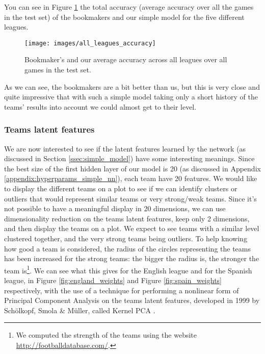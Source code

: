 \documentclass[10pt,conference,onecolumn]{IEEEtran}
\begin{document}
You can see in Figure \ref{fig:all_leagues_accuracy} the total accuracy (average accuracy over all the games in the test set) of the bookmakers and our simple model for the five different leagues.

\begin{figure}[H]
\centering
\texttt{[image: images/all\_leagues\_accuracy]}
\caption{Bookmaker's and our average accuracy across all leagues over all games in the test set.}
\label{fig:all_leagues_accuracy}
\end{figure}

As we can see, the bookmakers are a bit better than us, but this is very close and quite impressive that with such a simple model taking only a short history of the teams' results into account we could almost get to their level.
\newline

\subsubsection{Teams latent features}\label{ssec:teams_features}
We are now interested to see if the latent features learned by the network (as discussed in Section \ref{ssec:simple_model}) have some interesting meanings. Since the best size of the first hidden layer of our model is 20 (as discussed in Appendix \ref{appendix:hyperparams_simple_nn}), each team have 20 features. We would like to display the different teams on a plot to see if we can identify clusters or outliers that would represent similar teams or very strong/weak teams. Since it's not possible to have a meaningful display in 20 dimensions, we can use dimensionality reduction on the teams latent features, keep only 2 dimensions, and then display the teams on a plot. We expect to see teams with a similar level clustered together, and the very strong teams being outliers. To help knowing how good a team is considered, the radius of the circles representing the teams has been increased for the strong teams: the bigger the radius is, the stronger the team is\footnote{We computed the strength of the teams using the website \url{http://footballdatabase.com/}.}. We can see what this gives for the English league and for the Spanish league, in Figure \ref{fig:england_weights} and Figure \ref{fig:spain_weights} respectively, with the use of a technique for performing a nonlinear form of Principal Component Analysis on the teams latent features, developed in 1999 by Schölkopf, Smola \& Müller, called Kernel PCA \cite{kernel_pca}.
\end{document}

